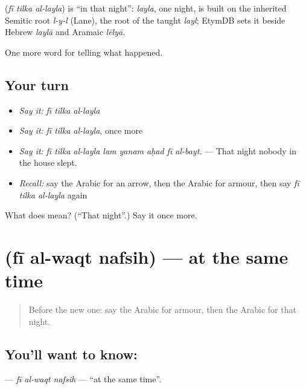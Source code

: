 \begin{cousinweb}
\textbf{  } (\emph{fī tilka al-layla}) is \textquotedblleft{}in that night\textquotedblright{}: \emph{layla}, one night, is built on the inherited Semitic root \emph{l-y-l} (Lane), the root of the taught \emph{layl}; EtymDB sets it beside Hebrew \emph{laylā} and Aramaic \emph{lēlyā}.
\end{cousinweb}

\begin{grammarlens}[title={What you've built}]
One more word for telling what happened.
\end{grammarlens}

\subsection*{Your turn}
\begin{itemize}
\raggedright
  \item \emph{Say it:} \emph{fī tilka al-layla}
  \item \emph{Say it:} \emph{fī tilka al-layla}, once more
  \item \emph{Say it:} \emph{fī tilka al-layla lam yanam aḥad fī al-bayt.} — That night nobody in the house slept.
  \item \emph{Recall:} say the Arabic for an arrow, then the Arabic for armour, then say \emph{fī tilka al-layla} again
\end{itemize}

\begin{tcolorbox}[breakable,colback=teal!4,colframe=teal!35!black,title={Before you move on}]
What does    mean? (\textquotedblleft{}That night\textquotedblright{}.) Say it once more.
\end{tcolorbox}
\section[\texorpdfstring{\ar{في} \ar{الوقت} \ar{نفسه} (fī al-waqt nafsih)}{في الوقت نفسه (fī al-waqt nafsih)}]{   (fī al-waqt nafsih) — at the same time}

\label{lesson:AR-C327-fi-al-waqt-nafsih}



\begin{quote}
Before the new one: say the Arabic for armour, then the Arabic for that night.
\end{quote}

\subsection*{You'll want to know:   }
\textbf{  } — \emph{fī al-waqt nafsih} — \textquotedblleft{}at the same time\textquotedblright{}.

